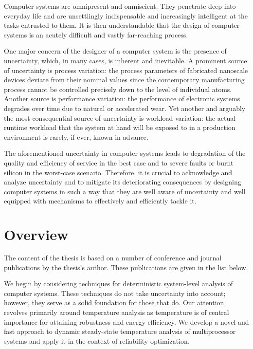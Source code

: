 Computer systems are omnipresent and omniscient. They penetrate deep into
everyday life and are unsettlingly indispensable and increasingly intelligent at
the tasks entrusted to them. It is then understandable that the design of
computer systems is an acutely difficult and vastly far-reaching process.

One major concern of the designer of a computer system is the presence of
uncertainty, which, in many cases, is inherent and inevitable. A prominent
source of uncertainty is process variation: the process parameters of fabricated
nanoscale devices deviate from their nominal values since the contemporary
manufacturing process cannot be controlled precisely down to the level of
individual atoms. Another source is performance variation: the performance of
electronic systems degrades over time due to natural or accelerated wear. Yet
another and arguably the most consequential source of uncertainty is workload
variation: the actual runtime workload that the system at hand will be exposed
to in a production environment is rarely, if ever, known in advance.

The aforementioned uncertainty in computer systems leads to degradation of the
quality and efficiency of service in the best case and to severe faults or burnt
silicon in the worst-case scenario. Therefore, it is crucial to acknowledge and
analyze uncertainty and to mitigate its deteriorating consequences by designing
computer systems in such a way that they are well aware of uncertainty and well
equipped with mechanisms to effectively and efficiently tackle it.

\section{Overview}

The content of the thesis is based on a number of conference and journal
publications by the thesis's author. These publications are given in the list
below.

\printbibliography[heading=none,keyword=own]

We begin by considering techniques for deterministic system-level analysis of
computer systems. These techniques do not take uncertainty into account;
however, they serve as a solid foundation for those that do. Our attention
revolves primarily around temperature analysis as temperature is of central
importance for attaining robustness and energy efficiency. We develop a novel
and fast approach to dynamic steady-state temperature analysis of multiprocessor
systems and apply it in the context of reliability optimization.

